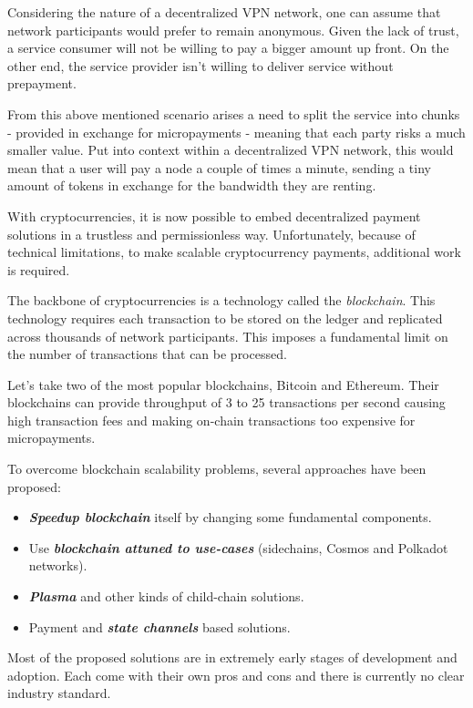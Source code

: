 \documentclass[a4paper,12pt]{article}
\begin{document}
Considering the nature of a decentralized VPN network, one can assume that network
participants would prefer to remain anonymous. Given the lack of trust, a service 
consumer will not be willing to pay a bigger amount up front. On the other end, the 
service provider isn’t willing to deliver service without prepayment. 

From this above mentioned scenario arises a need to split the service into chunks
- provided in exchange for micropayments - meaning that each party risks a much 
smaller value. Put into context within a decentralized VPN network, this would 
mean that a user will pay a node a couple of times a minute, sending a tiny amount 
of tokens in exchange for the bandwidth they are renting. 

With cryptocurrencies, it is now possible to embed decentralized payment solutions 
in a trustless and permissionless way. Unfortunately, because of technical 
limitations, to make scalable cryptocurrency payments, additional work is required. 

The backbone of cryptocurrencies is a technology called the \textit{blockchain}. 
This technology requires each transaction to be stored on the ledger and replicated 
across thousands of network participants. This imposes a fundamental limit on the 
number of transactions that can be processed. 

Let’s take two of the most popular blockchains, Bitcoin and Ethereum. Their 
blockchains can provide throughput of 3 to 25 transactions per second causing high
transaction fees and making on-chain transactions too expensive for micropayments. 

To overcome blockchain scalability problems, several approaches have been 
proposed:

\begin{itemize}
    \item \textit{\textbf{Speedup blockchain}} itself by changing some 
    fundamental components.
    \item Use \textit{\textbf{blockchain attuned to use-cases}} (sidechains, 
    Cosmos and Polkadot networks). 
    \item \textit{\textbf{Plasma}} and other kinds of child-chain solutions.
    \item Payment and \textit{\textbf{state channels}} based solutions.
\end{itemize}

Most of the proposed solutions are in extremely early stages of development and 
adoption. Each come with their own pros and cons and there is currently no clear 
industry standard.
\end{document}
